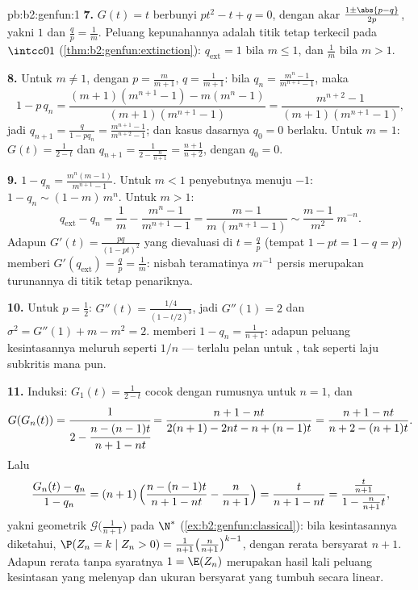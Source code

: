 \begin{solution}{pb:b2:genfun:1}
\textbf{7.} $G(t) = t$ berbunyi $pt^2 - t + q = 0$, dengan akar
$\frac{1 \pm \abs{p - q}}{2p}$, yakni $1$ dan $\frac qp =
\frac1m$. Peluang kepunahannya adalah titik tetap terkecil
pada $\intcc01$ (\cref{thm:b2:genfun:extinction}):
$q_{\mathrm{ext}} = 1$ bila $m \leq 1$, dan $\frac1m$ bila $m >
1$.

\textbf{8.} Untuk $m \neq 1$, dengan $p = \frac m{m+1}$, $q =
\frac1{m+1}$: bila $q_n = \frac{m^n - 1}{m^{n+1} - 1}$, maka
\[
1 - p\,q_n = \frac{(m+1)(m^{n+1} - 1) - m(m^n - 1)}
{(m+1)(m^{n+1} - 1)} = \frac{m^{n+2} - 1}{(m+1)(m^{n+1} -
1)},
\]
jadi $q_{n+1} = \frac{q}{1 - pq_n} = \frac{m^{n+1} -
1}{m^{n+2} - 1}$; dan kasus dasarnya $q_0 = 0$ berlaku. Untuk $m = 1$:
$G(t) = \frac1{2 - t}$ dan $q_{n+1} = \frac1{2 -
\frac{n}{n+1}} = \frac{n+1}{n+2}$, dengan $q_0 = 0$.

\textbf{9.} $1 - q_n = \frac{m^n(m - 1)}{m^{n+1} - 1}$. Untuk
$m < 1$ penyebutnya menuju $-1$: $1 - q_n \sim (1 -
m)\,m^n$. Untuk $m > 1$:
\[
q_{\mathrm{ext}} - q_n = \frac1m - \frac{m^n - 1}{m^{n+1} -
1} = \frac{m - 1}{m\,(m^{n+1} - 1)} \sim \frac{m -
1}{m^{2}}\;m^{-n} .
\]
Adapun $G'(t) = \frac{pq}{(1 - pt)^2}$ yang dievaluasi di $t = \frac
qp$ (tempat $1 - pt = 1 - q = p$) memberi $G'(q_{\mathrm{ext}})
= \frac qp = \frac1m$: nisbah teramatinya $m^{-1}$ persis
merupakan turunannya di titik tetap penariknya.

\textbf{10.} Untuk $p = \frac12$: $G''(t) = \frac{1/4}{(1 -
t/2)^3}$, jadi $G''(1) = 2$ dan $\sigma^2 = G''(1) + m - m^2 =
2$.  memberi $1 - q_n = \frac1{n+1}$: adapun
peluang kesintasannya meluruh seperti $1/n$ --- terlalu pelan untuk
, tak seperti laju subkritis mana pun.

\textbf{11.} Induksi: $G_1(t) = \frac1{2-t}$ cocok dengan
rumusnya untuk $n = 1$, dan
\[
G(G_n(t)) = \cfrac{1}{2 - \cfrac{n - (n-1)t}{n+1 - nt}}
= \frac{n + 1 - nt}{2(n+1) - 2nt - n + (n-1)t}
= \frac{n+1 - nt}{n + 2 - (n+1)t} .
\]
Lalu
\[
\frac{G_n(t) - q_n}{1 - q_n}
= (n+1)\,\Bigl(\frac{n - (n-1)t}{n+1 - nt} -
\frac{n}{n+1}\Bigr)
= \frac{t}{n + 1 - nt}
= \frac{\frac{t}{n+1}}{1 - \frac{n}{n+1}t} ,
\]
yakni   geometrik $\mathcal G\bigl(\frac1{n+1}
\bigr)$ pada $\N^*$ (\cref{ex:b2:genfun:classical}): bila
kesintasannya diketahui, $\P(Z_n = k \mid Z_n > 0) =
\frac1{n+1}\bigl(\frac n{n+1}\bigr)^{k-1}$, dengan rerata
bersyarat $n + 1$. Adapun rerata tanpa syaratnya $1 = \E(Z_n)$ merupakan
hasil kali peluang kesintasan yang melenyap dan ukuran bersyarat yang
tumbuh secara linear.


\end{solution}
